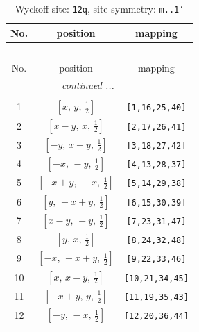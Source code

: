 \documentclass[fleqn,8pt]{jsarticle}
\begin{document}
\begin{longtable}{ccc}
\caption{Wyckoff site: {\tt 12q}, site symmetry: {\tt m..1'}}
 \\
 \hline \hline
No. & position & mapping \\ \hline \endfirsthead

\multicolumn{2}{l}{\tablename\ \thetable{}} \\
 \hline \hline
No. & position & mapping \\ \hline \endhead

 \hline \hline
\multicolumn{2}{r}{\footnotesize\it continued ...} \\ \endfoot

 \hline \hline
\multicolumn{2}{r}{} \\ \endlastfoot

1 & $\left[ x,\, y,\, \frac{1}{2} \right]$ & {\tt [1,16,25,40]} \\ \hline
2 & $\left[ x - y,\, x,\, \frac{1}{2} \right]$ & {\tt [2,17,26,41]} \\ \hline
3 & $\left[ - y,\, x - y,\, \frac{1}{2} \right]$ & {\tt [3,18,27,42]} \\ \hline
4 & $\left[ - x,\, - y,\, \frac{1}{2} \right]$ & {\tt [4,13,28,37]} \\ \hline
5 & $\left[ - x + y,\, - x,\, \frac{1}{2} \right]$ & {\tt [5,14,29,38]} \\ \hline
6 & $\left[ y,\, - x + y,\, \frac{1}{2} \right]$ & {\tt [6,15,30,39]} \\ \hline
7 & $\left[ x - y,\, - y,\, \frac{1}{2} \right]$ & {\tt [7,23,31,47]} \\ \hline
8 & $\left[ y,\, x,\, \frac{1}{2} \right]$ & {\tt [8,24,32,48]} \\ \hline
9 & $\left[ - x,\, - x + y,\, \frac{1}{2} \right]$ & {\tt [9,22,33,46]} \\ \hline
10 & $\left[ x,\, x - y,\, \frac{1}{2} \right]$ & {\tt [10,21,34,45]} \\ \hline
11 & $\left[ - x + y,\, y,\, \frac{1}{2} \right]$ & {\tt [11,19,35,43]} \\ \hline
12 & $\left[ - y,\, - x,\, \frac{1}{2} \right]$ & {\tt [12,20,36,44]} \\
\end{longtable}
\renewcommand{\arraystretch}{1.2}
\end{document}
